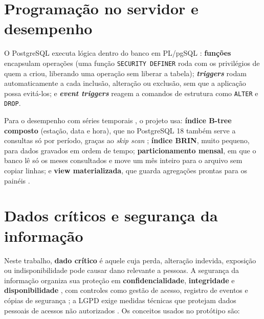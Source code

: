 \section{Programação no servidor e desempenho}

O PostgreSQL executa lógica dentro do banco em PL/pgSQL \parencite{pgdocs}: \textbf{funções} encapsulam operações (uma função \texttt{SECURITY DEFINER} roda com os privilégios de quem a criou, liberando uma operação sem liberar a tabela); \textbf{\textit{triggers}} rodam automaticamente a cada inclusão, alteração ou exclusão, sem que a aplicação possa evitá-los; e \textbf{\textit{event triggers}} reagem a comandos de estrutura como \texttt{ALTER} e \texttt{DROP}.

Para o desempenho com séries temporais \parencite{jensen2017,grzesik2020}, o projeto usa: \textbf{índice B-tree composto} (estação, data e hora), que no PostgreSQL 18 também serve a consultas só por período, graças ao \textit{skip scan} \parencite{pg18release}; \textbf{índice BRIN}, muito pequeno, para dados gravados em ordem de tempo; \textbf{particionamento mensal}, em que o banco lê só os meses consultados e move um mês inteiro para o arquivo sem copiar linhas; e \textbf{view materializada}, que guarda agregações prontas para os painéis \parencite{chirkova2012}.

\section{Dados críticos e segurança da informação}\label{sec:fund-criticos}

Neste trabalho, \textbf{dado crítico} é aquele cuja perda, alteração indevida, exposição ou indisponibilidade pode causar dano relevante a pessoas. A segurança da informação organiza sua proteção em \textbf{confidencialidade}, \textbf{integridade} e \textbf{disponibilidade} \parencite{iso27001}, com controles como gestão de acesso, registro de eventos e cópias de segurança \parencite{iso27002}; a LGPD exige medidas técnicas que protejam dados pessoais de acessos não autorizados \parencite{lgpd2018}. Os conceitos usados no protótipo são:

